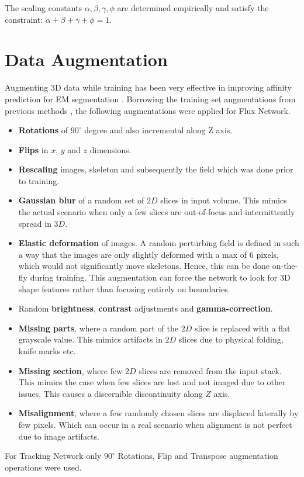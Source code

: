 The scaling constants $\alpha, \beta, \gamma, \phi$ are determined empirically and satisfy the constraint: $\alpha+\beta+\gamma+\phi = 1$. 

\section{Data Augmentation}
Augmenting 3D data while training has been very effective in improving affinity prediction for EM segmentation \cite{Zeng2017, Kisuk2017}. Borrowing the training set augmentations from previous methods \cite{Kisuk2017, ELEKTRONN}, the following augmentations were applied for Flux Network.
\begin{itemize}
	\item \textbf{Rotations} of $90^{\circ}$ degree and also incremental along Z axis.
	\item \textbf{Flips} in $x$, $y$ and $z$ dimensions.
	\item \textbf{Rescaling} images, skeleton and subsequently the field which was done prior to training.
	\item \textbf{Gaussian blur} of a random set of $2D$ slices in input volume. This mimics the actual scenario when only a few slices are out-of-focus and intermittently spread in $3D$.
	\item \textbf{Elastic deformation} of images. A random perturbing field is defined in such a way that the images are only slightly deformed with a max of 6 pixels, which would not significantly move skeletons. Hence, this can be done on-the-fly during training. This augmentation can force the network to look for 3D shape features rather than focusing entirely on boundaries.
	\item Random \textbf{brightness}, \textbf{contrast} adjustments and \textbf{gamma-correction}.
	\item \textbf{Missing parts}, where a random part of the $2D$ slice is replaced with a flat grayscale value. This mimics artifacts in $2D$ slices due to physical folding, knife marks etc.
	\item \textbf{Missing section}, where few $2D$ slices are removed from the input stack. This mimics the case when few slices are lost and not imaged due to other issues. This causes a discernible discontinuity along $Z$ axis.
	\item \textbf{Misalignment}, where a few randomly chosen slices are displaced laterally by few pixels. Which can occur in a real scenario when alignment is not perfect due to image artifacts. 
\end{itemize}

For Tracking Network only $90^{\circ}$ Rotations, Flip and Transpose augmentation operations were used.